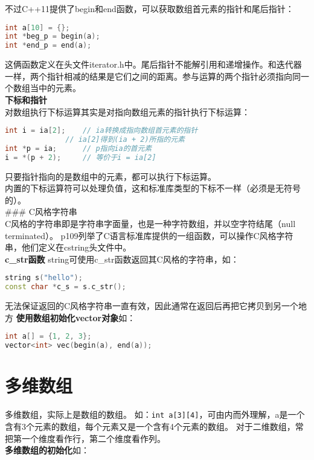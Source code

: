 \documentclass[
  a4paper,
  oneside,tablecaptionabove
]{scrbook}
\begin{document}
\begin{enumerate}
  不过C++11提供了begin和end函数，可以获取数组首元素的指针和尾后指针：

\begin{lstlisting}[language={C++}]
int a[10] = {};
int *beg_p = begin(a);
int *end_p = end(a);
\end{lstlisting}

  这俩函数定义在头文件iterator.h中。尾后指针不能解引用和递增操作。和迭代器一样，两个指针相减的结果是它们之间的距离。参与运算的两个指针必须指向同一个数组当中的元素。\\
  \textbf{下标和指针}\\
  对数组执行下标运算其实是对指向数组元素的指针执行下标运算：

\begin{lstlisting}[language={C++}]
int i = ia[2];    // ia转换成指向数组首元素的指针
              // ia[2]得到(ia + 2)所指的元素
int *p = ia;      // p指向ia的首元素
i = *(p + 2);     // 等价于i = ia[2]
\end{lstlisting}

  只要指针指向的是数组中的元素，都可以执行下标运算。\\
  内置的下标运算符可以处理负值，这和标准库类型的下标不一样（必须是无符号的）。\\
  \#\#\# C风格字符串\\
  C风格的字符串即是字符串字面量，也是一种字符数组，并以空字符结尾（null
  terminated）。
  p109列举了C语言标准库提供的一组函数，可以操作C风格字符串，他们定义在cstring头文件中。\\
  \textbf{c\_str函数} string可使用c\_str函数返回其C风格的字符串，如：

\begin{lstlisting}[language={C++}]
string s("hello");
const char *c_s = s.c_str();
\end{lstlisting}

  无法保证返回的C风格字符串一直有效，因此通常在返回后再把它拷贝到另一个地方
  \textbf{使用数组初始化vector对象}如：

\begin{lstlisting}[language={C++}]
int a[] = {1, 2, 3};
vector<int> vec(begin(a), end(a));
\end{lstlisting}

  \section{多维数组}\label{ux591aux7ef4ux6570ux7ec4}

  多维数组，实际上是数组的数组。
  如：\lstinline!int a[3][4]!，可由内而外理解，a是一个含有3个元素的数组，每个元素又是一个含有4个元素的数组。
  对于二维数组，常把第一个维度看作行，第二个维度看作列。\\
  \textbf{多维数组的初始化}如：


\end{enumerate}
\end{document}
